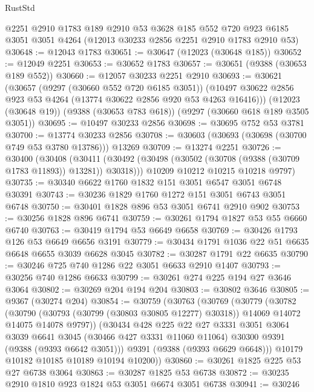 \begin{lexlean}{RustStd}
\begin{coremodule}
    @2251
    @2910
    @1783
    @189
    @2910
    @53
    @3628
    @185
    @552
    @720
    @923
    @6185
    @3051
    @3051
    @4264
    (@12013 @30233 @2856 @2251 @2910 @1783 @2910 @53)
@30648 := @12043 @1783
@30651 := @30647 (@12023 (@30648 @185))
@30652 := @12049 @2251
@30653 := @30652 @1783
@30657 := @30651 (@9388 (@30653 @189 @552))
@30660 := @12057 @30233 @2251 @2910
@30693 := @30621
    (@30657
      (@9297 (@30660 @552 @720 @6185 @3051))
      (@10497 @30622 @2856 @923 @53 @4264 (@13774 @30622 @2856 @920 @53 @4263 @16416)))
    (@12023 (@30648 @19))
    (@9388 (@30653 @783 @618))
    (@9297 (@30660 @618 @189 @3505 @3051))
@30695 := @10497 @30233 @2856
@30698 := @30695 @752 @53 @3781
@30700 := @13774 @30233 @2856
@30708 := @30603 (@30693 (@30698 (@30700 @749 @53 @3780 @13786))) @13269
@30709 := @13274 @2251
@30726 := @30400
    (@30408
      (@30411 (@30492 (@30498 (@30502 (@30708 (@9388 (@30709 @1783 @11893)) @13281)) @30318)))
      @10209
      @10212
      @10215
      @10218
      @9797)
@30735 := @30340 @6622 @1760 @1832 @151 @3051 @6547 @3051 @6748 @30391
@30743 := @30236 @1829 @1760 @1272 @151 @3051 @6743 @3051 @6748
@30750 := @30401 @1828 @896 @53 @3051 @6741 @2910 @902
@30753 := @30256 @1828 @896 @6741
@30759 := @30261 @1794 @1827 @53 @55 @6660 @6740
@30763 := @30419 @1794 @53 @6649 @6658
@30769 := @30426 @1793 @126 @53 @6649 @6656 @3191
@30779 := @30434 @1791 @1036 @22 @51 @6635 @6648 @6655 @3039 @6628 @3045
@30782 := @30287 @1791 @22 @6635
@30790 := @30246 @725 @740 @1286 @22 @3051 @6633 @2910 @1407
@30793 := @30256 @740 @1286 @6633
@30799 := @30261 @274 @225 @194 @27 @3646 @3064
@30802 := @30269 @204 @194 @204
@30803 := @30802 @3646
@30805 := @9367 (@30274 @204)
@30854 := @30759
    (@30763
      (@30769
        (@30779
          (@30782
            (@30790
              (@30793 (@30799 (@30803 @30805 @12277) @30318))
              @14069
              @14072
              @14075
              @14078
              @9797))
          (@30434
            @428
            @225
            @22
            @27
            @3331
            @3051
            @3064
            @3039
            @6641
            @3045
            (@30466 @427 @3331 @11060 @11064)
            @30300
            @9391
            (@9388 (@9393 @6642 @3051)))
          @9391
          (@9388 (@9393 @6629 @6648)))
        @10179
        @10182
        @10185
        @10189
        @10194
        @10200))
@30860 := @30261 @1825 @225 @53 @27 @6738 @3064
@30863 := @30287 @1825 @53 @6738
@30872 := @30235 @2910 @1810 @923 @1824 @53 @3051 @6674 @3051 @6738
@30941 := @30246

\end{coremodule}
\end{lexlean}
